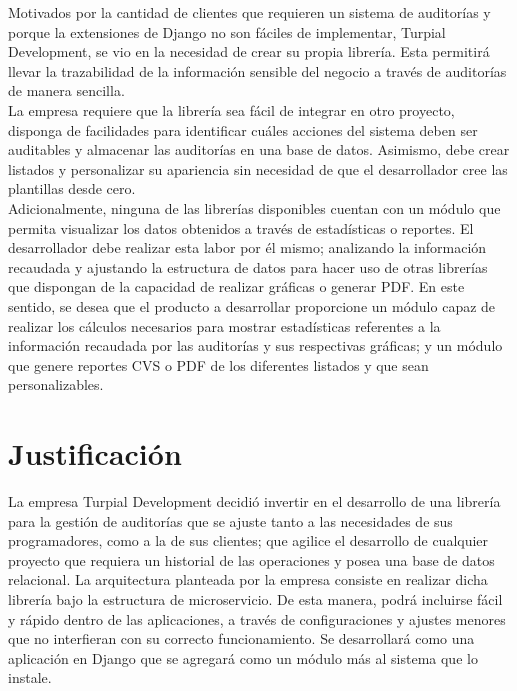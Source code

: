 Motivados por la cantidad de clientes que requieren un sistema de auditorías y
porque la extensiones de Django no son fáciles de implementar, Turpial
Development, se vio en la necesidad de crear su propia librería. Esta permitirá
llevar la trazabilidad de la información sensible del negocio a través de
auditorías de manera sencilla.\\

La empresa requiere que la librería sea fácil de integrar en otro proyecto,
disponga de facilidades para identificar cuáles acciones del sistema deben ser
auditables y almacenar las auditorías en una base de datos. Asimismo, debe
crear listados y personalizar su apariencia sin necesidad de que el
desarrollador cree las plantillas desde cero.\\

Adicionalmente, ninguna de las librerías disponibles cuentan con un módulo que
permita visualizar los datos obtenidos a través de estadísticas o reportes. El
desarrollador debe realizar esta labor por él mismo; analizando la información
recaudada y ajustando la estructura de datos para hacer uso de otras librerías
que dispongan de la capacidad de realizar gráficas o generar PDF. En este
sentido, se desea que el producto a desarrollar proporcione un módulo capaz de
realizar los cálculos necesarios para mostrar estadísticas referentes a la
información recaudada por las auditorías y sus respectivas gráficas; y un
módulo que genere reportes CVS o PDF de los diferentes listados y que sean
personalizables.

\section{Justificación}

La empresa Turpial Development decidió invertir en el desarrollo de una
librería para la gestión de auditorías que se ajuste tanto a las necesidades de
sus programadores, como a la de sus clientes; que agilice el desarrollo de
cualquier proyecto que requiera un historial de las operaciones y posea una
base de datos relacional. La arquitectura planteada por la empresa consiste en
realizar dicha librería bajo la estructura de microservicio. De esta manera,
podrá incluirse fácil y rápido dentro de las aplicaciones, a través de
configuraciones y ajustes menores que no interfieran con su correcto
funcionamiento. Se desarrollará como una aplicación en Django que se agregará
como un módulo más al sistema que lo instale.\\

